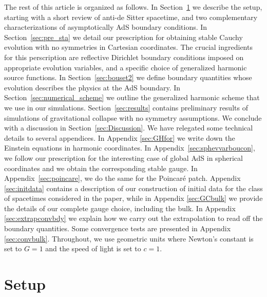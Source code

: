 \documentclass[a4paper,11pt]{article}
\numberwithin{equation}{section}
\begin{document}
The rest of this article is organized as follows.
In Section~\ref{sec:setup} we describe the setup, starting with a short review of anti-de Sitter spacetime, and two complementary characterizations of asymptotically AdS boundary conditions.
In Section~\ref{sec:pre_sta} we detail our prescription for obtaining stable Cauchy evolution with no symmetries in Cartesian coordinates. 
The crucial ingredients for this perscription are reflective Dirichlet boundary conditions imposed on appropriate evolution variables, and a specific choice of generalized harmonic source functions. In Section~\ref{sec:bouset2} we define boundary quantities whose evolution describes the physics at the AdS boundary.
In Section~\ref{sec:numerical_scheme} we outline the generalized harmonic scheme that we use in our simulations. 
Section~\ref{sec:results} contains preliminary results of simulations of gravitational collapse with no symmetry assumptions.
We conclude with a discussion in Section~\ref{sec:Discussion}. We have relegated some technical details to several appendices. In Appendix \ref{sec:GHfor} we write down the Einstein equations in harmonic coordinates. In Appendix~\ref{sec:sphevvarboucon}, we follow our prescription for the interesting case of global AdS in spherical coordinates and we obtain the corresponding stable gauge. In Appendix~\ref{sec:poincare}, we do the same for the Poincar\'e patch. Appendix \ref{sec:initdata} contains a description of our construction of initial data for the class of spacetimes considered in the paper, while in Appendix \ref{sec:GCbulk} we provide the details of our complete gauge choice, including the bulk. In Appendix \ref{sec:extrapconvbdy} we explain how we carry out the extrapolation to read off the boundary quantities. Some convergence tests are presented in Appendix \ref{sec:convbulk}.
Throughout, we use geometric units where Newton's constant is set to $G=1$ and the speed of light is set to $c=1$.



\section{Setup}\label{sec:setup}
\end{document}
